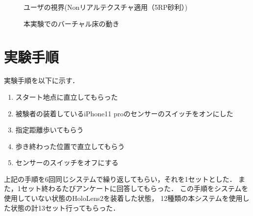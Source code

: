 \begin{figure}[H]
    \centering
    \caption{ユーザの視界(Nonリアルテクスチャ適用（5RP砂利）)}
    \label{fig:nonsiten}
\end{figure}

\begin{figure}[H]
    \centering
    \caption{本実験でのバーチャル床の動き}
    \label{fig:maekara}
\end{figure}

\section{実験手順}
実験手順を以下に示す．
\begin{enumerate}
    \item スタート地点に直立してもらった
    \item 被験者の装着しているiPhone11 proのセンサーのスイッチをオンにした
    \item 指定距離歩いてもらう
    \item 歩き終わった位置で直立してもらう
    \item センサーのスイッチをオフにする
\end{enumerate}
上記の手順を6回同じシステムで繰り返してもらい，それを1セットとした．
また，1セット終わるたびアンケートに回答してもらった．
この手順をシステムを使用していない状態のHoloLens2を装着した状態，
12種類の本システムを使用した状態の計13セット行ってもらった．



